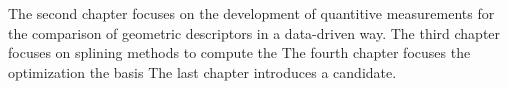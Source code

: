 The second chapter focuses on the development of quantitive measurements for the comparison of geometric descriptors in a data-driven way.
The third chapter focuses on splining methods to compute the 
The fourth chapter focuses the optimization the basis
The last chapter introduces a candidate.




